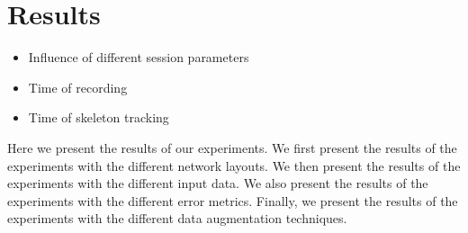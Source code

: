 \chapter{Results}

\begin{itemize}
  \item Influence of different session parameters
  \item Time of recording
  \item Time of skeleton tracking
\end{itemize}

Here we present the results of our experiments. We first present the results of the experiments with the different network layouts. We then present the results of the experiments with the different input data. We also present the results of the experiments with the different error metrics. Finally, we present the results of the experiments with the different data augmentation techniques.
